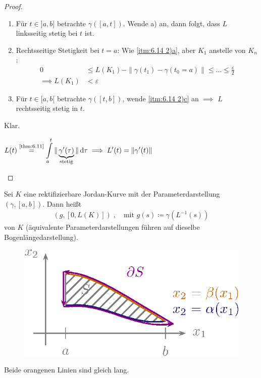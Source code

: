 \documentclass[a4paper,10pt]{scrbook}
\begin{document}
\begin{theorem}[Hilfssatz]
\begin{proof}
\begin{enum-arab}
\begin{enumerate}
        \item \label{itm:6.14 2)b} Für $t \in ]a,b]$ betrachte $\gamma([a,t])$. Wende a) an, dann folgt, dass $L$ linksseitig stetig bei $t$ ist.

        \item \label{itm:6.14 2)c} Rechtsseitige Stetigkeit bei $t = a$: Wie \ref{itm:6.14 2)a}, aber $K_1$ anstelle von $K_n$:
        \begin{align*}
          0 &\leq L(K_1) - \|\gamma(t_1) - \gamma(t_0 = a)\| \leq \ldots \leq \frac{\varepsilon}{2} \\
          \implies L(K_1) &< \varepsilon
        \end{align*}

        \item Für $t \in [a,b[$ betrachte $\gamma([t,b])$, wende \ref{itm:6.14 2)c} an $\implies$ $L$ rechtsseitig stetig in $t$.
      \end{enumerate}

      \item Klar.

      \item $\displaystyle L(t) \overset{\text{\ref{thm:6.11}}}{=} \int\limits_{a}^{t} \|\underbrace{\gamma'(\tau)}_{\text{stetig}}\| \, \mathrm{d}\tau \implies L'(t) = \|\gamma'(t)\|$
    \end{enum-arab}
  \end{proof}
\end{theorem}

\begin{theorem}[Definition]
  Sei $K$ eine rektifizierbare Jordan-Kurve mit der Parameterdarstellung $(\gamma,[a,b])$. Dann heißt
  \begin{align*}
    (g,[0,L(K)]) \; , \quad \text{mit } g(s) \coloneq \gamma(L^{-1}(s))
  \end{align*}
   von $K$ (äquivalente Parameterdarstellungen führen auf dieselbe Bogenlängedarstellung).

  \begin{figure}[H]
    \centering
    \includegraphics[scale=0.2]{images/ana3-tmp-56}
  \end{figure}
  Beide {\color{DarkOrange3} orangenen} Linien sind gleich lang.
\end{theorem}
\end{document}
